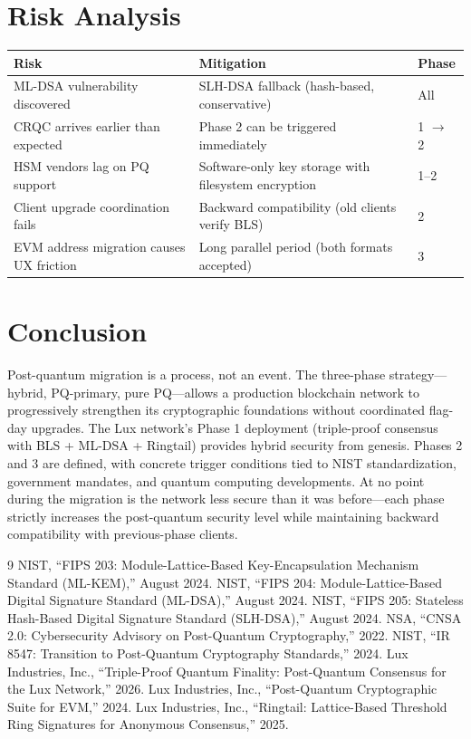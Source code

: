 \documentclass[11pt,a4paper]{article}
\begin{document}
\section{Risk Analysis}

\begin{center}
\begin{tabular}{lll}
\toprule
\textbf{Risk} & \textbf{Mitigation} & \textbf{Phase} \\
\midrule
ML-DSA vulnerability discovered & SLH-DSA fallback (hash-based, conservative) & All \\
CRQC arrives earlier than expected & Phase 2 can be triggered immediately & 1 $\to$ 2 \\
HSM vendors lag on PQ support & Software-only key storage with filesystem encryption & 1--2 \\
Client upgrade coordination fails & Backward compatibility (old clients verify BLS) & 2 \\
EVM address migration causes UX friction & Long parallel period (both formats accepted) & 3 \\
\bottomrule
\end{tabular}
\end{center}

\section{Conclusion}

Post-quantum migration is a process, not an event. The three-phase strategy---hybrid, PQ-primary, pure PQ---allows a production blockchain network to progressively strengthen its cryptographic foundations without coordinated flag-day upgrades. The Lux network's Phase 1 deployment (triple-proof consensus with BLS + ML-DSA + Ringtail) provides hybrid security from genesis. Phases 2 and 3 are defined, with concrete trigger conditions tied to NIST standardization, government mandates, and quantum computing developments. At no point during the migration is the network less secure than it was before---each phase strictly increases the post-quantum security level while maintaining backward compatibility with previous-phase clients.

\begin{thebibliography}{9}
 NIST, ``FIPS 203: Module-Lattice-Based Key-Encapsulation Mechanism Standard (ML-KEM),'' August 2024.
 NIST, ``FIPS 204: Module-Lattice-Based Digital Signature Standard (ML-DSA),'' August 2024.
 NIST, ``FIPS 205: Stateless Hash-Based Digital Signature Standard (SLH-DSA),'' August 2024.
 NSA, ``CNSA 2.0: Cybersecurity Advisory on Post-Quantum Cryptography,'' 2022.
 NIST, ``IR 8547: Transition to Post-Quantum Cryptography Standards,'' 2024.
 Lux Industries, Inc., ``Triple-Proof Quantum Finality: Post-Quantum Consensus for the Lux Network,'' 2026.
 Lux Industries, Inc., ``Post-Quantum Cryptographic Suite for EVM,'' 2024.
 Lux Industries, Inc., ``Ringtail: Lattice-Based Threshold Ring Signatures for Anonymous Consensus,'' 2025.
\end{thebibliography}
\end{document}
